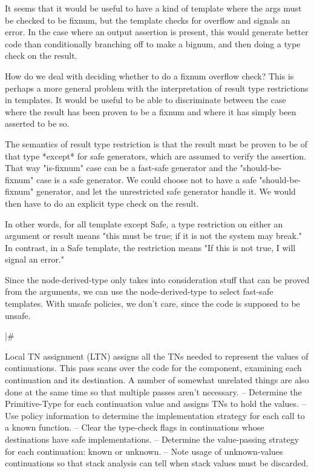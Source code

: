 It seems that it would be useful to have a kind of template where the args must
be checked to be fixnum, but the template checks for overflow and signals an
error.  In the case where an output assertion is present, this would generate
better code than conditionally branching off to make a bignum, and then doing a
type check on the result.

    How do we deal with deciding whether to do a fixnum overflow check?  This
    is perhaps a more general problem with the interpretation of result type
    restrictions in templates.  It would be useful to be able to discriminate
    between the case where the result has been proven to be a fixnum and where
    it has simply been asserted to be so.

    The semantics of result type restriction is that the result must be proven
    to be of that type *except* for safe generators, which are assumed to
    verify the assertion.  That way "is-fixnum" case can be a fast-safe
    generator and the "should-be-fixnum" case is a safe generator.  We could
    choose not to have a safe "should-be-fixnum" generator, and let the
    unrestricted safe generator handle it.  We would then have to do an
    explicit type check on the result.

    In other words, for all template except Safe, a type restriction on either
    an argument or result means "this must be true; if it is not the system may
    break."  In contrast, in a Safe template, the restriction means "If this is
    not true, I will signal an error."

    Since the node-derived-type only takes into consideration stuff that can be
    proved from the arguments, we can use the node-derived-type to select
    fast-safe templates.  With unsafe policies, we don't care, since the code
    is supposed to be unsafe.

|\#

Local TN assignment (LTN) assigns all the TNs needed to represent the values of
continuations.  This pass scans over the code for the component, examining each
continuation and its destination.  A number of somewhat unrelated things are
also done at the same time so that multiple passes aren't necessary.
 -- Determine the Primitive-Type for each continuation value and assigns TNs
    to hold the values.
 -- Use policy information to determine the implementation strategy for each
    call to a known function.
 -- Clear the type-check flags in continuations whose destinations have safe
    implementations.
 -- Determine the value-passing strategy for each continuation: known or
    unknown.
 -- Note usage of unknown-values continuations so that stack analysis can tell
    when stack values must be discarded.
 
